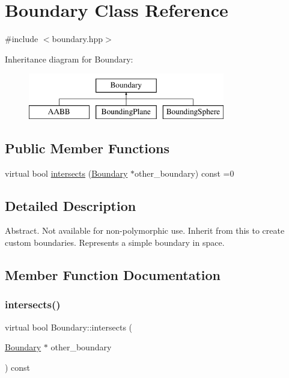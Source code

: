 \hypertarget{class_boundary}{}\section{Boundary Class Reference}
\label{class_boundary}


{\ttfamily \#include $<$boundary.\+hpp$>$}

Inheritance diagram for Boundary\+:\begin{figure}[H]
\begin{center}
\leavevmode
\includegraphics[height=2.000000cm]{class_boundary}
\end{center}
\end{figure}
\subsection*{Public Member Functions}
\begin{DoxyCompactItemize}
\item 
virtual bool \mbox{\hyperlink{class_boundary_a364909bdfa4a4945f974c34a39e198cc}{intersects}} (\mbox{\hyperlink{class_boundary}{Boundary}} $\ast$other\+\_\+boundary) const =0
\end{DoxyCompactItemize}


\subsection{Detailed Description}
Abstract. Not available for non-\/polymorphic use. Inherit from this to create custom boundaries. Represents a simple boundary in space. 

\subsection{Member Function Documentation}
\mbox{\label{class_boundary_a364909bdfa4a4945f974c34a39e198cc}} 
\subsubsection{\texorpdfstring{intersects()}{intersects()}}
{\footnotesize\ttfamily virtual bool Boundary\+::intersects (\begin{DoxyParamCaption}\item[{\mbox{\hyperlink{class_boundary}{Boundary}} $\ast$}]{other\+\_\+boundary }\end{DoxyParamCaption}) const\hspace{0.3cm}{\ttfamily [pure virtual]}}


